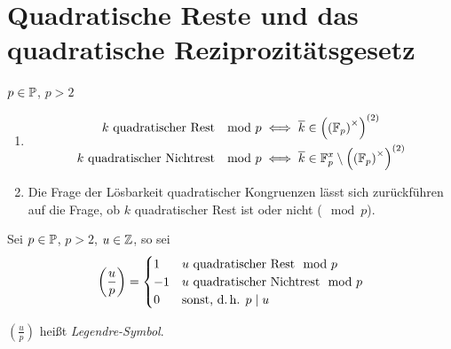 \documentclass[a4paper,twoside,DIV15,BCOR12mm]{scrbook}
\begin{document}
\section{Quadratische Reste und das quadratische Reziprozitätsgesetz}
$p\in\mathbb{P}$, $p>2$
\begin{definition}
\begin{enumerate}
\item \begin{align*}
    k \text{ quadratischer Rest } \mod p &      \iff \overline k \in \left(\left(\mathbb{F}_p\right)^{\times}\right)^{(2)} \\
    k \text{ quadratischer Nichtrest } \mod p & \iff \overline k \in \mathbb{F}_p^x \setminus \left(\left(\mathbb{F}_p\right)^{\times}\right)^{(2)} \\
    \end{align*}
\item Die Frage der Lösbarkeit quadratischer Kongruenzen lässt sich zurückführen auf die Frage, ob $k$ quadratischer Rest ist oder nicht ($\mod p$).
\end{enumerate}
\end{definition}

\begin{definition}
Sei $p \in \mathbb{P}$, $p>2$, $u \in \mathbb{Z}$, so sei
\[
\left(\frac{u}{p}\right) = \begin{cases}
    1  & u \text{ quadratischer Rest} \mod p\\
    -1 & u \text{ quadratischer Nichtrest} \mod p\\
    0  & \text{sonst, d.\,h. }p \mid u
    \end{cases}
\]

$\left(\frac{u}{p}\right)$ heißt \emph{Legendre-Symbol}.
\end{definition}
\end{document}
